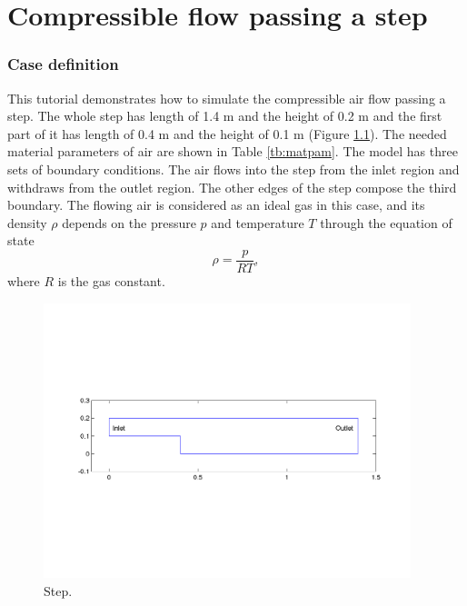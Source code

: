\chapter{Compressible flow passing a step}


\subsection*{Case definition}

This tutorial demonstrates how to simulate the compressible air flow passing a step. The whole step has length of 1.4 m and the height of 0.2 m and the first part of it has length of 0.4 m and the height of 0.1 m (Figure \ref{fg:step_geometry}). The needed material parameters of air are shown in Table \ref{tb:matpam}. 
The model has three sets of boundary conditions.
The air flows into the step from the inlet region and withdraws from the outlet region. The other edges of the step compose the third boundary. The flowing air is considered as an ideal gas in this case, and its density $\rho$  depends on the pressure $p$ and temperature $T$ through the equation of state
\begin{displaymath}
\rho = \frac{p}{RT},
\end{displaymath}
where $R$ is the gas constant.

\begin{figure}[h]
\centering
\includegraphics[height=80mm]{step_geometry.png}
\caption{Step.}\label{fg:step_geometry}
\end{figure}

